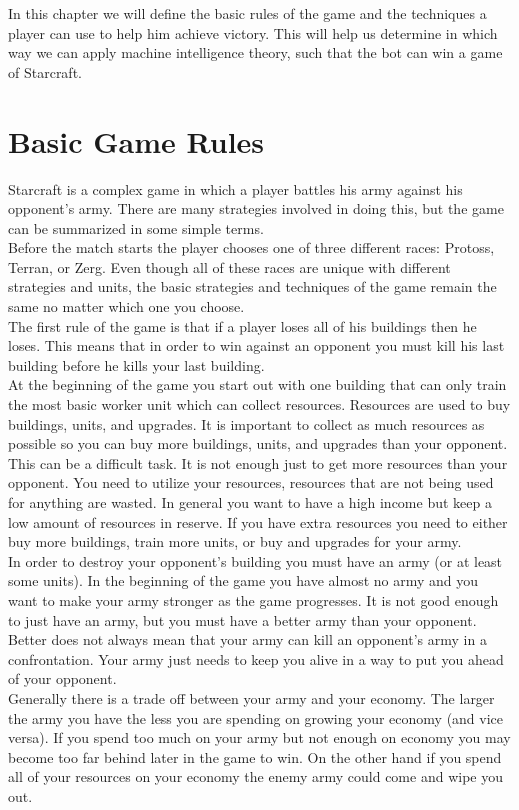 In this chapter we will define the basic rules of the game and the techniques a player can use to help him achieve victory.
This will help us determine in which way we can apply machine intelligence theory, such that the bot can win a game of Starcraft. 

\section{Basic Game Rules}
	Starcraft is a complex game in which a player battles his army against his opponent's army. 
	There are many strategies involved in doing this, but the game can be summarized in some simple terms.\\
	Before the match starts the player chooses one of three different races: Protoss, Terran, or Zerg. 
	Even though all of these races are unique with different strategies and units, 
	the basic strategies and techniques of the game remain the same no matter which one you choose.\\	
	The first rule of the game is that if a player loses all of his buildings then he loses. 
	This means that in order to win against an opponent you must kill his last building before he kills your last building. \\	
	At the beginning of the game you start out with one building that can only train the most basic worker unit which can collect resources. 
	Resources are used to buy buildings, units, and upgrades. 
	It is important to collect  as much resources as possible so you can buy more buildings, units, and upgrades than your opponent.
	This can be a difficult task. It is not enough just to get more resources than your opponent. 
	You need to utilize your resources, resources that are not being used for anything are wasted. 
	In general you want to have a high income but keep a low amount of resources in reserve. 
	If you have extra resources you need to either buy more buildings, train more units, or buy and upgrades for your army.\\
	In order to destroy your opponent's building you must have an army (or at least some units). 
	In the beginning of the game you have almost no army and you want to make your army stronger as the game progresses. 
	It is not good enough to just have an army, but you must have a better army than your opponent. 
	Better does not always mean that your army can kill an opponent's army in a confrontation. 
	Your army just needs to keep you alive in a way to put you ahead of your opponent.\\	
	Generally there is a trade off between your army and your economy. 
	The larger the army you have the less you are spending on growing your economy (and vice versa). 
	If you spend too much on your army but not enough on economy you may become too far behind later in the game to win. 
	On the other hand if you spend all of your resources on your economy the enemy army could come and wipe you out.\\

 